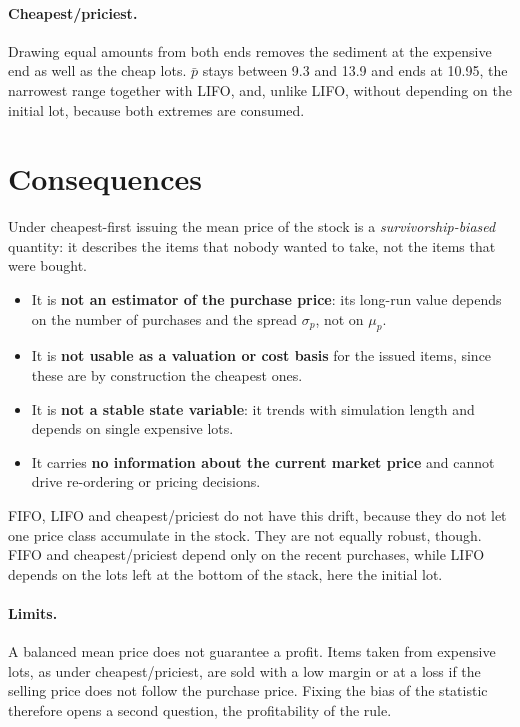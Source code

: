 \documentclass[11pt,a4paper]{article}
\begin{document}
\paragraph{Cheapest/priciest.}
Drawing equal amounts from both ends removes the sediment at the expensive end
as well as the cheap lots. $\bar p$ stays between 9.3 and 13.9 and ends at
10.95, the narrowest range together with LIFO, and, unlike LIFO, without
depending on the initial lot, because both extremes are consumed.

\section{Consequences}

Under cheapest-first issuing the mean price of the stock is a
\emph{survivorship-biased} quantity: it describes the items that nobody wanted
to take, not the items that were bought.
\begin{itemize}
  \item It is \textbf{not an estimator of the purchase price}: its long-run
        value depends on the number of purchases and the spread $\sigma_p$,
        not on $\mu_p$.
  \item It is \textbf{not usable as a valuation or cost basis} for the issued
        items, since these are by construction the cheapest ones.
  \item It is \textbf{not a stable state variable}: it trends with simulation
        length and depends on single expensive lots.
  \item It carries \textbf{no information about the current market price} and
        cannot drive re-ordering or pricing decisions.
\end{itemize}
FIFO, LIFO and cheapest/priciest do not have this drift, because they do not
let one price class accumulate in the stock. They are not equally robust,
though. FIFO and cheapest/priciest depend only on the recent purchases, while
LIFO depends on the lots left at the bottom of the stack, here the initial lot.

\paragraph{Limits.}
A balanced mean price does not guarantee a profit. Items taken from expensive
lots, as under cheapest/priciest, are sold with a low margin or at a loss if
the selling price does not follow the purchase price. Fixing the bias of the
statistic therefore opens a second question, the profitability of the rule.
\end{document}

